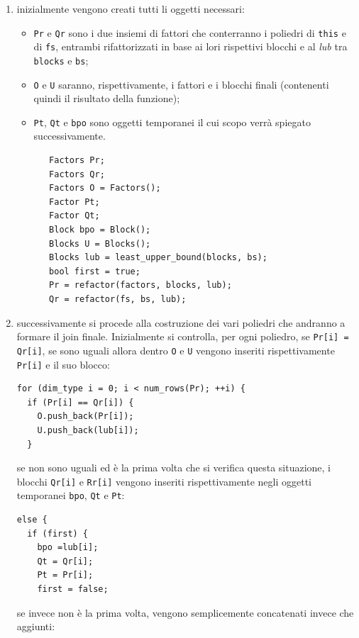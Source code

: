 \documentclass[italian]{mimosis}
\theoremstyle{definition}
\begin{document}
\begin{enumerate}
\item inizialmente vengono creati tutti li oggetti necessari:
\begin{itemize}
\item \texttt{Pr} e \texttt{Qr} sono i due insiemi di fattori che conterranno i
poliedri di \texttt{this} e di \texttt{fs}, entrambi rifattorizzati in base ai lori
rispettivi blocchi e al \emph{lub} tra \texttt{blocks} e \texttt{bs};
\item \texttt{O} e \texttt{U} saranno, rispettivamente, i fattori e i blocchi finali
(contenenti quindi il risultato della funzione);
\item \texttt{Pt}, \texttt{Qt} e \texttt{bpo} sono oggetti temporanei il cui scopo verrà spiegato
successivamente.
\lstset{style=mystyle,language=C++,label= ,caption= ,captionpos=b,numbers=none}
\begin{lstlisting}
   Factors Pr;
   Factors Qr;
   Factors O = Factors();
   Factor Pt;
   Factor Qt;
   Block bpo = Block();
   Blocks U = Blocks();
   Blocks lub = least_upper_bound(blocks, bs);
   bool first = true;
   Pr = refactor(factors, blocks, lub);
   Qr = refactor(fs, bs, lub);
\end{lstlisting}
\end{itemize}
\item successivamente si procede alla costruzione dei vari poliedri che andranno a
formare il join finale. Inizialmente si controlla, per ogni poliedro, se
\texttt{Pr[i] = Qr[i]}, se sono uguali allora dentro \texttt{O} e \texttt{U} vengono inseriti
rispettivamente \texttt{Pr[i]} e il suo blocco:
\lstset{style=mystyle,language=C++,label= ,caption= ,captionpos=b,numbers=none}
\begin{lstlisting}
for (dim_type i = 0; i < num_rows(Pr); ++i) {
  if (Pr[i] == Qr[i]) {
    O.push_back(Pr[i]);
    U.push_back(lub[i]);
  }
\end{lstlisting}
se non sono uguali ed è la prima volta che si verifica
questa situazione, i blocchi \texttt{Qr[i]} e \texttt{Rr[i]} vengono inseriti
rispettivamente negli oggetti temporanei \texttt{bpo}, \texttt{Qt} e \texttt{Pt}:
\lstset{style=mystyle,language=C++,label= ,caption= ,captionpos=b,numbers=none}
\begin{lstlisting}
else {
  if (first) {
    bpo =lub[i];
    Qt = Qr[i];
    Pt = Pr[i];
    first = false;
\end{lstlisting}
se invece non è la prima volta, vengono semplicemente concatenati invece che
aggiunti:
\lstset{style=mystyle,language=C++,label= ,caption= ,captionpos=b,numbers=none}

\end{enumerate}
\end{document}
